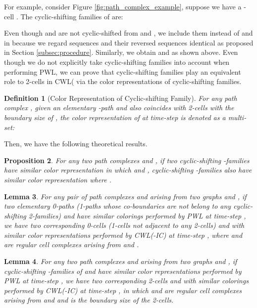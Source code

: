 \documentclass[letterpaper]{article} \usepackage{aaai24}  \usepackage{times}  \usepackage{helvet}  \usepackage{courier}  \usepackage[hyphens]{url}  \usepackage{graphicx} \urlstyle{rm} \def\UrlFont{\rm}  \usepackage{natbib}  \usepackage{caption} \frenchspacing  \setlength{\pdfpagewidth}{8.5in} \setlength{\pdfpageheight}{11in} \usepackage{algorithm}
\newtheorem{definition}{Definition}
\newtheorem{proposition}[definition]{Proposition}
\newtheorem{lemma}[definition]{Lemma}
\begin{document}
For example, consider Figure \ref{fig:path_complex_example}, suppose we have a -cell . The cyclic-shifting families of  are:

Even though  and  are not cyclic-shifted from  and , we include them instead of  and  in  because we regard sequences and their reversed sequences identical as proposed in Section \ref{subsec:procedure}. Similarly, we obtain  and  as shown above.  Even though we do not explicitly take cyclic-shifting families into account when performing PWL, we can prove that cyclic-shifting families play an equivalent role to 2-cells in CWL( via the color representations of cyclic-shifting families.

\begin{definition}[Color Representation of Cyclic-shifting Family]
    For any path complex , given an elementary -path  and  also coincides with 2-cells with the boundary size of , the color representation of  at time-step  is denoted as a multi-set:

\end{definition}
Then, we have the following theoretical results.

\begin{proposition}\label{proposition:cyclic-shifting families}
    For any two path complexes  and , if two cyclic-shifting -families have similar color representation   in which  and , cyclic-shifting -families also have similar color representation  where .
\end{proposition}

\begin{lemma} \label{lemma:p-paths to 0-cells}
    For any pair of path complexes  and  arising from two graphs  and , if two elementary 0-paths (1-paths whose co-boundaries are not belong to any cyclic-shifting 2-families)  and  have similar colorings  performed by PWL at time-step , we have two corresponding 0-cells (1-cells not adjacent to any 2-cells)  and  with similar color representations  performed by CWL(-IC) at time-step , where  and  are regular cell complexes arising from  and .
\end{lemma}

\begin{lemma}\label{lemma:p-paths to 2-cells}
    For any two path complexes  and  arising from two graphs  and , if cyclic-shifting -families of  and   have similar color representations  performed by PWL at time-step , we have two corresponding 2-cells  and  with similar colorings  performed by CWL(-IC) at time-step , in which  and  are regular cell complexes arising from  and  and  is the boundary size of the 2-cells.
\end{lemma}
\end{document}
